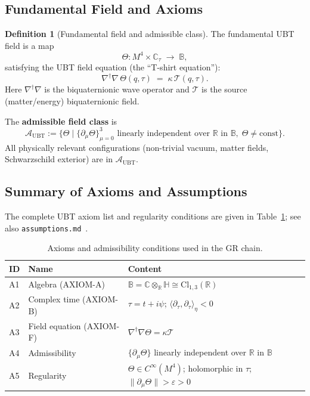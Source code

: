 \documentclass[12pt,a4paper]{article}
\theoremstyle{definition}
\newtheorem{definition}[theorem]{Definition}
\theoremstyle{remark}
\newcommand{\BB}{\mathbb{B}}
\newcommand{\CC}{\mathbb{C}}
\newcommand{\RR}{\mathbb{R}}
\newcommand{\HH}{\mathbb{H}}
\newcommand{\calA}{\mathcal{A}}
\newcommand{\calT}{\mathcal{T}}
\begin{document}
\subsection{Fundamental Field and Axioms}

\begin{definition}[Fundamental field and admissible class]
\label{def:theta}
The fundamental UBT field is a map
\[
  \Theta : M^4 \times \CC_\tau \;\longrightarrow\; \BB,
\]
satisfying the UBT field equation (the ``T-shirt equation''):
\[
  \nabla^\dagger\nabla\,\Theta(q,\tau) \;=\; \kappa\,\calT(q,\tau).
\]
Here $\nabla^\dagger\nabla$ is the biquaternionic wave operator and
$\calT$ is the source (matter/energy) biquaternionic field.

The \textbf{admissible field class} is
\[
  \calA_{\mathrm{UBT}} :=
  \bigl\{\Theta \;\big|\; \{\partial_\mu\Theta\}_{\mu=0}^3
  \text{ linearly independent over } \RR \text{ in } \BB,\;
  \Theta \neq \mathrm{const}\bigr\}.
\]
All physically relevant configurations (non-trivial vacuum, matter fields,
Schwarzschild exterior) are in $\calA_{\mathrm{UBT}}$.
\end{definition}

\subsection{Summary of Axioms and Assumptions}

The complete UBT axiom list and regularity conditions are given in
Table~\ref{tab:axioms}; see also \texttt{assumptions.md}~\cite{jaros2026_canonical}.

\begin{table}[ht]
\centering
\caption{Axioms and admissibility conditions used in the GR chain.}
\label{tab:axioms}
\begin{tabular}{lll}
\toprule
\textbf{ID} & \textbf{Name} & \textbf{Content} \\
\midrule
A1 & Algebra (AXIOM-A) & $\BB = \CC\otimes_\RR\HH \cong \mathrm{Cl}_{1,3}(\RR)$ \\
A2 & Complex time (AXIOM-B) & $\tau = t+i\psi$; $\langle\partial_\tau,\partial_\tau\rangle_\eta < 0$ \\
A3 & Field equation (AXIOM-F) & $\nabla^\dagger\nabla\Theta = \kappa\calT$ \\
A4 & Admissibility & $\{\partial_\mu\Theta\}$ linearly independent over $\RR$ in $\BB$ \\
A5 & Regularity & $\Theta \in C^\infty(M^4)$; holomorphic in $\tau$;
                   $\|\partial_\mu\Theta\| > \varepsilon > 0$ \\
\bottomrule
\end{tabular}
\end{table}
\end{document}
